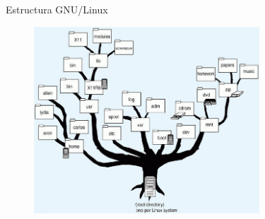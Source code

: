 \documentclass{beamer}
\begin{document}
\begin{frame}{Estructura GNU/Linux}
\begin{figure}
	\includegraphics[height=7cm]{img/estructura.jpg}
\end{figure}
\end{frame}
\end{document}

